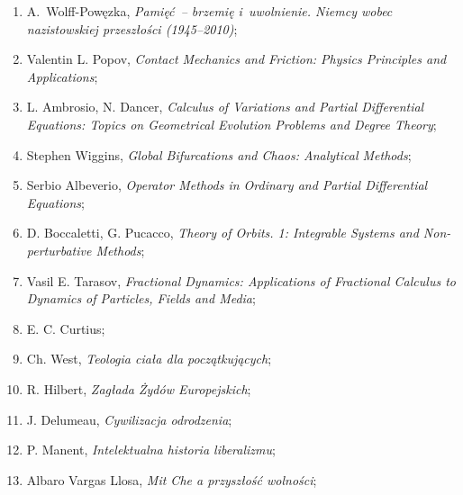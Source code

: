 \documentclass[a4paper,11pt]{article}
\begin{document}
\begin{enumerate}
\item A.~Wolff-Powęzka, \textit{Pamięć~-- brzemię i~uwolnienie. Niemcy
    wobec nazistowskiej przeszłości (1945--2010)};



\item Valentin L. Popov, \textit{Contact Mechanics and Friction: Physics
    Principles and Applications};



\item L. Ambrosio, N. Dancer, \textit{Calculus of Variations and Partial
    Differential Equations: Topics on Geometrical Evolution Problems
    and Degree Theory};



\item Stephen Wiggins, \textit{Global Bifurcations and Chaos: Analytical
    Methods};



\item Serbio Albeverio, \textit{Operator Methods in Ordinary and Partial
    Differential Equations};



\item D. Boccaletti, G. Pucacco, \textit{Theory of Orbits. 1: Integrable
    Systems and Non-perturbative Methods};



\item Vasil E. Tarasov, \textit{Fractional Dynamics: Applications of
    Fractional Calculus to Dynamics of Particles, Fields and Media};



\item E. C. Curtius;



\item Ch. West, \textit{Teologia ciała dla początkujących};



\item R. Hilbert, \textit{Zagłada Żydów Europejskich};



\item J. Delumeau, \textit{Cywilizacja odrodzenia};



\item P. Manent, \textit{Intelektualna historia liberalizmu};



\item Albaro Vargas Llosa, \textit{Mit Che a przyszłość wolności};




\end{enumerate}
\end{document}
